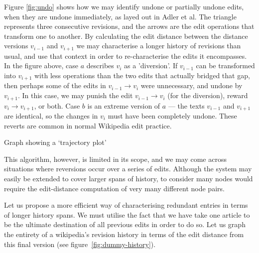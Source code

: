 Figure \ref{fig:undo} shows how we may identify undone or partially
undone edits, when they are undone immediately, as layed out in Adler
et al.\cite{Adler2007} The triangle represents three consecutive
revisions, and the arrows are the edit operations that transform one
to another. By calculating the edit distance between the distance
versions $v_{i-1}$ and $v_{i+1}$ we may characterise a longer history
of revisions than usual, and use that context in order to
re-characterise the edits it encompasses. In the figure above, case
$a$ describes $v_i$ as a 'diversion'. If $v_{i-1}$ can be transformed
into $v_{i+1}$ with less operations than the two edits that actually
bridged that gap, then perhaps some of the edits in $v_{i-1}
\rightarrow v_i$ were unnecessary, and undone by $v_{i+1}$. In this
case, we may punish the edit $v_{i-1} \rightarrow v_i$ (for the
diversion), reward $v_{i} \rightarrow v_{i+1}$, or both. Case $b$ is
an extreme version of $a$ --- the texts $v_{i-1}$ and $v_{i+1}$ are
identical, so the changes in $v_i$ must have been completely
undone. These reverts are common in normal Wikipedia edit
practice.\cite{wiki-revert}

\begin{floatingfigure}[p]{0.4\textwidth}
  \centering
  \pgfplotsset{width=0.4\textwidth}
  \caption{Graph showing a `trajectory plot'}
  \label{fig:dummy-history}
\end{floatingfigure}

This algorithm, however, is limited in its scope, and we may
come across situations where reversions occur over a series of
edits. Although the system may easily be extended to cover
larger spans of history, to consider many nodes would require
the edit-distance computation of very many different node
pairs. 

Let us propose a more efficient way of characterising redundant
entries in terms of longer history spans. We must utilise the fact
that we have take one article to be the ultimate destination of all
previous edits in order to do so. Let us graph the entirety of a
wikipedia's revision history in terms of the edit distance from this
final version (see figure~\ref{fig:dummy-history}).

